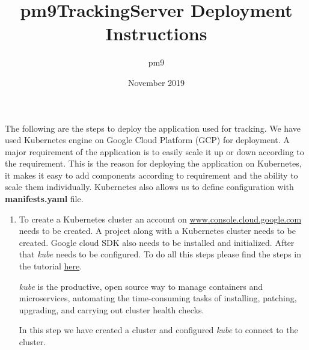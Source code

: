 \documentclass{article}
\title{pm9TrackingServer Deployment Instructions}
\author{pm9}
\date{November 2019}
\begin{document}
\maketitle

The following are the steps to deploy the application used for tracking. We have used Kubernetes engine on Google Cloud Platform (GCP) for deployment. A major requirement of the application is to easily scale it up or down according to the requirement. This is the reason for deploying the application on Kubernetes, it makes it easy to add components according to requirement and the ability to scale them individually. Kubernetes also allows us to define configuration with \textbf{manifests.yaml} file.
\begin{enumerate}
\item
To create a Kubernetes cluster an account on \url{www.console.cloud.google.com} needs to be created. A project along with a Kubernetes cluster needs to be created. Google cloud SDK also needs to be installed and initialized. After that \textit{kube} needs to be configured. To do all this steps please find the steps in the tutorial \href{https://medium.com/nycdev/deploy-to-a-managed-kubernetes-cluster-on-google-cloud-894d35b83619}{here}.
\par
\textit{kube} is the productive, open source way to manage containers and microservices, automating the time-consuming tasks of installing, patching, upgrading, and carrying out cluster health checks.
\par In this step we have created a cluster and configured \textit{kube} to connect to the cluster.


\end{enumerate}
\end{document}
